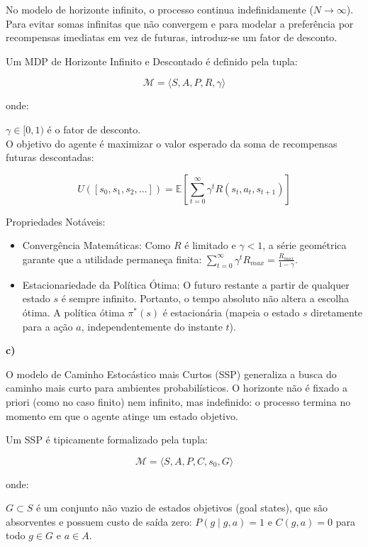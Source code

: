 \documentclass[a4paper,12pt]{article}
\begin{document}
No modelo de horizonte infinito, o processo continua indefinidamente ($N \to \infty$). Para evitar somas infinitas que não convergem e para modelar a preferência por recompensas imediatas em vez de futuras, introduz-se um fator de desconto.

Um MDP de Horizonte Infinito e Descontado é definido pela tupla:

$$\mathcal{M} = \langle S, A, P, R, \gamma \rangle$$

onde:

$\gamma \in [0, 1)$ é o fator de desconto.\\

O objetivo do agente é maximizar o valor esperado da soma de recompensas futuras descontadas:

$$U([s_0, s_1, s_2, \dots]) = \mathbb{E} \left[ \sum_{t=0}^{\infty} \gamma^t R(s_t, a_t, s_{t+1}) \right]$$

Propriedades Notáveis:
\begin{itemize}
	\item Convergência Matemáticas: Como $R$ é limitado e $\gamma < 1$, a série geométrica garante que a utilidade permaneça finita: $\sum_{t=0}^{\infty} \gamma^t R_{max} = \frac{R_{max}}{1 - \gamma}$.
	\item Estacionariedade da Política Ótima: O futuro restante a partir de qualquer estado $s$ é sempre infinito. Portanto, o tempo absoluto não altera a escolha ótima. A política ótima $\pi^*(s)$ é estacionária (mapeia o estado $s$ diretamente para a ação $a$, independentemente do instante $t$).
\end{itemize}

\bigskip

\textbf{c)}

O modelo de Caminho Estocástico mais Curtos (SSP) generaliza a busca do caminho mais curto para ambientes probabilísticos. O horizonte não é fixado a priori (como no caso finito) nem infinito, mas indefinido: o processo termina no momento em que o agente atinge um estado objetivo.

Um SSP é tipicamente formalizado pela tupla:

$$\mathcal{M} = \langle S, A, P, C, s_0, G \rangle$$

onde:

$G \subset S$ é um conjunto não vazio de estados objetivos (goal states), que são absorventes e possuem custo de saída zero: $P(g \mid g, a) = 1$ e $C(g, a) = 0$ para todo $g \in G$ e $a \in A$.\\
\end{document}
